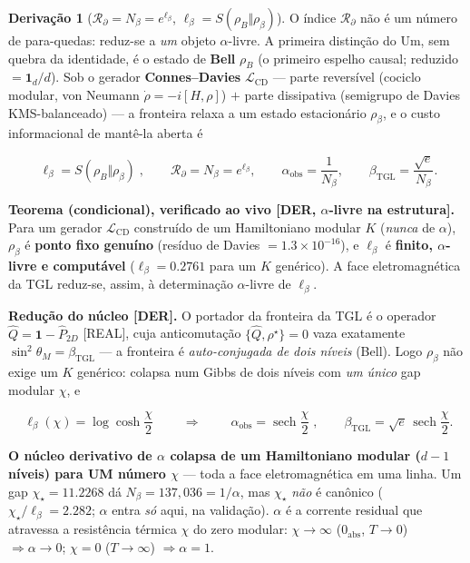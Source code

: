 \documentclass[11pt]{article}
\newcommand{\bTGL}{\beta_{\mathrm{TGL}}}\newcommand{\Msun}{M_{\odot}}\newcommand{\TGL}{\mathrm{TGL}}
\theoremstyle{definition}\newtheorem{deriv}{Derivação}
\begin{document}
\begin{deriv}[$\mathcal{R}_\partial=N_\beta=e^{\ell_\beta}$, $\ell_\beta=S(\rho_B\Vert\rho_\beta)$]

O índice $\mathcal{R}_\partial$ não é um número de para-quedas: reduz-se a \emph{um} objeto $\alpha$-livre. A primeira distinção do Um, sem quebra da identidade, é o estado de \textbf{Bell} $\rho_B$ (o primeiro espelho causal; reduzido $=\mathbf 1_d/d$). Sob o gerador \textbf{Connes--Davies} $\mathcal{L}_{\mathrm{CD}}$ --- parte reversível (cociclo modular, von Neumann $\dot\rho=-i[H,\rho]$) $+$ parte dissipativa (semigrupo de Davies KMS-balanceado) --- a fronteira relaxa a um estado estacionário $\rho_\beta$, e o custo informacional de mantê-la aberta é

\begin{equation}\boxed{\;\ell_\beta=S(\rho_B\Vert\rho_\beta)\;},\qquad \mathcal{R}_\partial=N_\beta=e^{\ell_\beta},\qquad \alpha_{\mathrm{obs}}=\frac{1}{N_\beta},\qquad \bTGL=\frac{\sqrt e}{N_\beta}.\end{equation}

\textbf{Teorema (condicional), verificado ao vivo \textsf{[DER, $\alpha$-livre na estrutura]}.} Para um gerador $\mathcal{L}_{\mathrm{CD}}$ construído de um Hamiltoniano modular $K$ (\emph{nunca} de $\alpha$), $\rho_\beta$ é \textbf{ponto fixo genuíno} (resíduo de Davies $=1.3\times10^{-16}$), e $\ell_\beta$ é \textbf{finito, $\alpha$-livre e computável} ($\ell_\beta=0.2761$ para um $K$ genérico). A face eletromagnética da TGL reduz-se, assim, à determinação $\alpha$-livre de $\ell_\beta$.

\textbf{Redução do núcleo \textsf{[DER]}.} O portador da fronteira da TGL é o operador $\hat Q=\mathbf 1-\hat P_{2D}$ \textsf{[REAL]}, cuja anticomutação $\{\hat Q,\rho^\star\}=0$ vaza exatamente $\sin^2\theta_M=\bTGL$ --- a fronteira é \emph{auto-conjugada de dois níveis} (Bell). Logo $\rho_\beta$ não exige um $K$ genérico: colapsa num Gibbs de dois níveis com \emph{um único} gap modular $\chi$, e

\begin{equation}\boxed{\;\ell_\beta(\chi)=\log\cosh\frac{\chi}{2}\;}\qquad\Longrightarrow\qquad\boxed{\;\alpha_{\mathrm{obs}}=\operatorname{sech}\frac{\chi}{2}\;},\qquad \bTGL=\sqrt e\,\operatorname{sech}\frac{\chi}{2}.\end{equation}

\textbf{O núcleo derivativo de $\alpha$ colapsa de um Hamiltoniano modular ($d-1$ níveis) para UM número $\chi$} --- toda a face eletromagnética em uma linha. Um gap $\chi_\star=11.2268$ dá $N_\beta=137{,}036=1/\alpha$, mas $\chi_\star$ \emph{não} é canônico ($\chi_\star/\ell_\beta=2.282$; $\alpha$ entra \emph{só} aqui, na validação). $\alpha$ é a corrente residual que atravessa a resistência térmica $\chi$ do zero modular: $\chi\to\infty$ ($0_{\mathrm{abs}}$, $T\to0$) $\Rightarrow\alpha\to0$; $\chi=0$ ($T\to\infty$) $\Rightarrow\alpha=1$.


\end{deriv}
\end{document}
